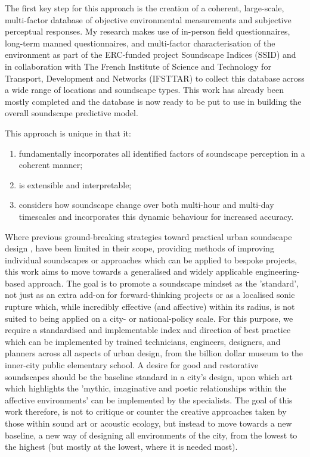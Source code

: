 The first key step for this approach is the creation of a coherent, large-scale, multi-factor database of objective environmental measurements and subjective perceptual responses. My research makes use of in-person field questionnaires, long-term manned questionnaires, and multi-factor characterisation of the environment as part of the ERC-funded project Soundscape Indices (SSID) and in collaboration with The French Institute of Science and Technology for Transport, Development and Networks (IFSTTAR) to collect this database across a wide range of locations and soundscape types. This work has already been mostly completed and the database is now ready to be put to use in building the overall soundscape predictive model.

This approach is unique in that it:
\begin{enumerate}
  \item fundamentally incorporates all identified factors of soundscape perception in a coherent manner;
  \item is extensible and interpretable;
  \item considers how soundscape change over both multi-hour and multi-day timescales and incorporates this dynamic behaviour for increased accuracy.
\end{enumerate}

Where previous ground-breaking strategies toward practical urban soundscape design \citep{Lacey2019Noise}, have been limited in their scope, providing methods of improving individual soundscapes or approaches which can be applied to bespoke projects, this work aims to move towards a generalised and widely applicable engineering-based approach. The goal is to promote a soundscape mindset as the 'standard', not just as an extra add-on for forward-thinking projects or as a localised sonic rupture which, while incredibly effective (and affective) within its radius, is not suited to being applied on a city- or national-policy scale. For this purpose, we require a standardised and implementable index and direction of best practice which can be implemented by trained technicians, engineers, designers, and planners across all aspects of urban design, from the billion dollar museum to the inner-city public elementary school. A desire for good and restorative soundscapes should be the baseline standard in a city's design, upon which art which highlights the 'mythic, imaginative and poetic relationships within the affective environments' \citep{Lacey2019Noise} can be implemented by the specialists. The goal of this work therefore, is not to critique or counter the creative approaches taken by those within sound art or acoustic ecology, but instead to move towards a new baseline, a new way of designing all environments of the city, from the lowest to the highest (but mostly at the lowest, where it is needed most).



